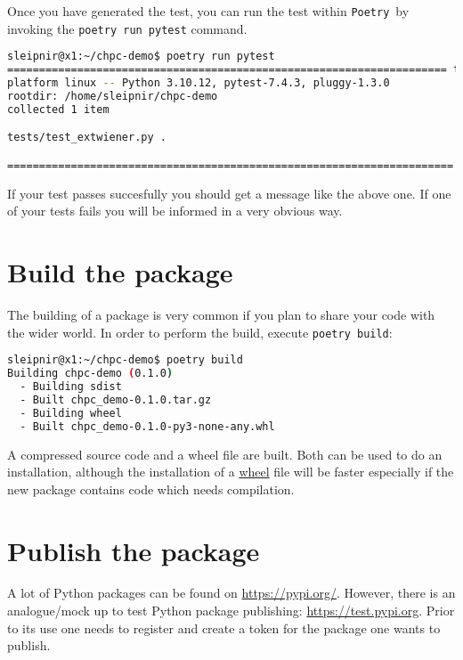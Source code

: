 \documentclass[10pt]{article}
\newcommand{\POETRY}{\texttt{Poetry}}
\begin{document}
Once you have generated the test, you can run the test within \POETRY\ by invoking the \lstinline[language=bash]{poetry run pytest} command.
\begin{lstlisting}[language=bash]
sleipnir@x1:~/chpc-demo$ poetry run pytest
===================================================================== test session starts ===================
platform linux -- Python 3.10.12, pytest-7.4.3, pluggy-1.3.0
rootdir: /home/sleipnir/chpc-demo
collected 1 item                                                                                                                                              

tests/test_extwiener.py .                                                                                                                               [100%]

====================================================================== 1 passed in 0.07s ====================
\end{lstlisting}
If your test passes succesfully you should get a message like the above one. If one of your tests fails you will be
informed in a very obvious way.


\section{Build the package}
The building of a package is very common if you plan to share your code with the wider world.
In order to perform the build, execute \texttt{poetry build}:
\begin{lstlisting}[language=bash]
sleipnir@x1:~/chpc-demo$ poetry build
Building chpc-demo (0.1.0)
  - Building sdist
  - Built chpc_demo-0.1.0.tar.gz
  - Building wheel
  - Built chpc_demo-0.1.0-py3-none-any.whl
\end{lstlisting}
A compressed source code and a wheel file are built.
Both can be used to do an installation, although the installation of a \href{https://wheel.readthedocs.io/en/stable/}{wheel} file will be faster
especially if the new package contains code which needs compilation.

\section{Publish the package}
A lot of Python packages can be found on \href{https://pypi.org/}{https://pypi.org/}. 
However, there is an analogue/mock up to test Python package publishing: \href{https://test.pypi.org}{https://test.pypi.org}.
Prior to its use one needs to register and create a token for the package one wants to publish.
\end{document}
